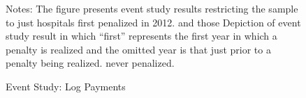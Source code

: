 \documentclass[12pt]{article}
\begin{document}
\setlength{\captionmargin}{.5 \textwidth} \addtolength{\captionmargin}{-.5\wd\gfxbox}
\begin{figure}[htbp!]
\centering
\caption{Event Study: Log Payments}
\label{fig:event}
\usebox{\gfxbox}
\par
\begin{minipage}{\wd\gfxbox}
\footnotesize
Notes:  The figure presents event study results restricting the sample to just hospitals first penalized in 2012.   and those Depiction of event study result in which ``first'' represents the first year in which a penalty is realized and the omitted year is that just prior to a penalty being realized.  never penalized.
\end{minipage}
\end{figure}
\end{document}
